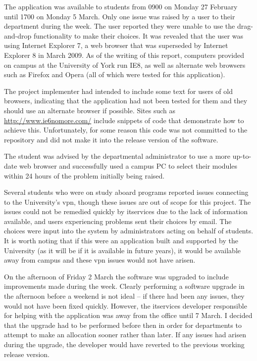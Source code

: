 The application was available to students from 0900 on Monday 27 February
until 1700 on Monday 5 March. Only one issue was raised by a user to their
department during the week. The user reported they were unable to use the
drag-and-drop functionality to make their choices. It was revealed that the
user was using Internet Explorer 7, a web browser that was superseded by
Internet Explorer 8 in March 2009. As of the writing of this report, computers
provided on campus at the University of York run IE8, as well as alternate web
browsers such as Firefox and Opera (all of which were tested for this
application).

The project implementer had intended to include some text for users of old
browsers, indicating that the application had not been tested for them and
they should use an alternate browser if possible. Sites such as
\url{http://www.ie6nomore.com/} include snippets of code that demonstrate how
to achieve this. Unfortunately, for some reason this code was not committed to
the repository and did not make it into the release version of the software.

The student was advised by the departmental administrator to use a more
up-to-date web browser and successfully used a campus PC to select their
modules within 24 hours of the problem initially being raised.

Several students who were on study aboard programs reported issues connecting
to the University's \gls{vpn}, though these issues are out of scope for this
project. The issues could not be remedied quickly by \gls{itservices} due to
the lack of information available, and users experiencing problems sent their
choices by email. The choices were input into the system by administrators
acting on behalf of students. It is worth noting that if this were an
application built and supported by the University (as it will be if it is
available in future years), it would be available away from campus and these
\gls{vpn} issues would not have arisen.

On the afternoon of Friday 2 March the software was upgraded to include
improvements made during the week. Clearly performing a software upgrade in
the afternoon before a weekend is not ideal -- if there had been any issues,
they would not have been fixed quickly. However, the \gls{itservices}
developer responsible for helping with the application was away from the
office until 7 March. I decided that the upgrade had to be performed before
then in order for departments to attempt to make an allocation sooner rather
than later. If any issues had arisen during the upgrade, the developer would
have reverted to the previous working release version.

